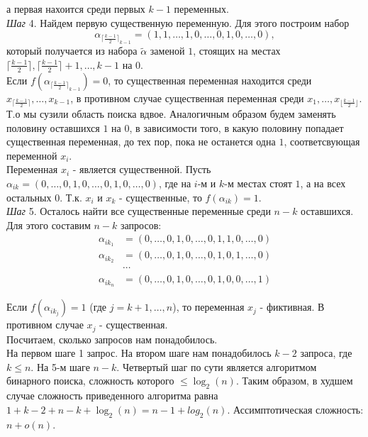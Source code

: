 \documentclass[oneside, final, 12pt]{extreport}
\begin{document}
	 а первая нахоится среди первых $k-1$ переменных. \\
	\emph{Шаг} 4. Найдем первую существенную переменную. Для этого построим набор 
	$${\alpha_{\lceil \frac{k-1}{2}\rceil_{k-1}}} = (1, 1, \ldots, 1, 0, \ldots, 0, 1, 0, \ldots, 0),$$
	 который получается из набора $\tilde{\alpha}$ заменой $1$, стоящих на местах $\lceil \frac{k-1}{2} \rceil, \lceil \frac{k-1}{2} \rceil + 1, \ldots, k-1$ на $0$. \\
	 Если $f({\alpha_{\lceil\frac{k-1}{2}\rceil_{k-1}}}) = 0$, то существенная переменная находится среди $x_{\lceil\frac{k-1}{2}\rceil}, \ldots, x_{k-1}$, в противном
	 случае существенная переменная среди $x_1, \ldots, x_{\lfloor \frac{k-1}{2} \rfloor}$. Т.о мы сузили область поиска вдвое. Аналогичным образом 
	 будем заменять половину оставшихся $1$ на $0$, в зависимости  того, в какую половину попадает существенная переменная, до тех пор, пока не останется 
	 одна $1$, соответсвующая переменной $x_i$. \\
	 Переменная $x_i$ - является существенной. Пусть $\alpha_{ik} = (0, \ldots,0, 1, 0, \ldots, 0, 1, 0, \ldots, 0)$, где на $i$-м и  $k$-м местах стоят $1$, а на всех 
	 остальных $0$. Т.к. $x_i$ и $x_k$ - существенные, то  $f(\alpha_{ik}) = 1$. \\
	 \emph{Шаг} 5. Осталось найти все существенные переменные среди $n-k$ оставшихся. Для этого составим $n-k$ запросов: 
	 \begin{displaymath}
	 \begin{aligned}
	 	\alpha_{ik_1} & = (0, \ldots,0, 1, 0, \ldots, 0, 1, 1, 0, \ldots, 0) \\
	 	\alpha_{ik_2} & = (0, \ldots,0, 1, 0, \ldots, 0, 1, 0, 1, \ldots, 0) \\
	 	                    & \cdots \\
	 	\alpha_{ik_n} & = (0, \ldots,0, 1, 0, \ldots, 0, 1, 0, 0, \ldots, 1)
	 \end{aligned}
	 \end{displaymath}
	
	Если $f(\alpha_{ik_j}) = 1$ (где $j = k+1, \ldots, n$), то переменная $x_j$ - фиктивная. В противном случае $x_j$ - существенная.\\
	Посчитаем, сколько запросов нам понадобилось. \\
	На первом шаге 1 запрос. На втором шаге нам понадобилось $k-2$ запроса, где $k \leq n$. На 5-м шаге  $n-k$. Четвертый шаг по сути является
	алгоритмом бинарного поиска, сложность которого $ \leq \log_2(n)$. Таким образом, в худшем случае сложность приведенного алгоритма равна 
	$1 + k - 2 + n - k + \log_2(n) = n - 1 + log_2(n)$. Ассимптотическая сложность: $n + o(n)$.
	
\end{document}
